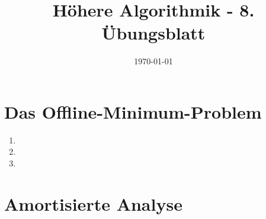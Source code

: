 \documentclass[a4paper,10pt]{article}
\title{H\"ohere Algorithmik - 8. \"Ubungsblatt}
\author{\Authors}
\date{\today}
\begin{document}
\maketitle

\section{Das Offline-Minimum-Problem}
\begin{enumerate}
\item   
\item   
\item   
\end{enumerate}

\section{Amortisierte Analyse}
\end{document}
